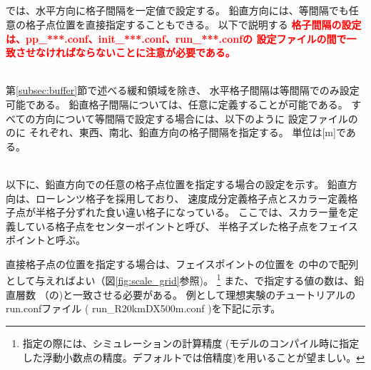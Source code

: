 \subsection{\SubsecGridIntvSettng} \label{subsec:gridinterv}
\scalerm では、水平方向に格子間隔を一定値で設定する。
鉛直方向には、等間隔でも任意の格子点位置を直接指定することもできる。
以下で説明する
\textcolor{red}{\bf 格子間隔の設定は、pp\_***.conf、init\_***.conf、run\_***.confの
設定ファイルの間で一致させなければならないことに注意が必要である。}

~\\

第\ref{subsec:buffer}節で述べる緩和領域を除き、
水平格子間隔は等間隔でのみ設定可能である。
鉛直格子間隔については、任意に定義することが可能である。
すべての方向について等間隔で設定する場合には、以下のように
設定ファイルののに
それぞれ、東西、南北、鉛直方向の格子間隔を指定する。
単位は[m]である。

\\


以下に、鉛直方向での任意の格子点位置を指定する場合の設定を示す。
鉛直方向は、ローレンツ格子を採用しており、
速度成分定義格子点とスカラー定義格子点が半格子分ずれた食い違い格子になっている。
ここでは、スカラー量を定義している格子点をセンターポイントと呼び、
半格子ズレた格子点をフェイスポイントと呼ぶ。

直接格子点の位置を指定する場合は、フェイスポイントの位置を
の中ので配列として与えればよい（図\ref{fig:scale_grid}参照)。
\footnote{指定の際には、シミュレーションの計算精度
(モデルのコンパイル時に指定した浮動小数点の精度。デフォルトでは倍精度)を用いることが望ましい。}
また、で指定する値の数は、鉛直層数
（の)と一致させる必要がある。
例として理想実験のチュートリアルのrun.confファイル
( run\_R20kmDX500m.conf )を下記に示す。

